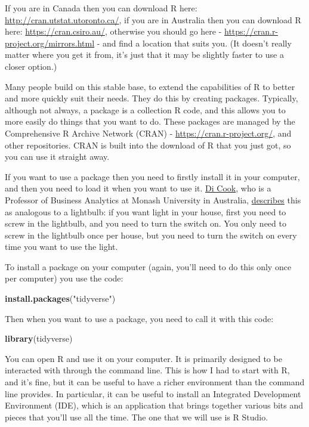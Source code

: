 \documentclass[
]{book}
\newenvironment{Shaded}{\begin{snugshade}}{\end{snugshade}}
\newcommand{\KeywordTok}[1]{\textcolor[rgb]{0.13,0.29,0.53}{\textbf{#1}}}
\newcommand{\NormalTok}[1]{#1}
\newcommand{\StringTok}[1]{\textcolor[rgb]{0.31,0.60,0.02}{#1}}
\begin{document}
If you are in Canada then you can download R here: \url{http://cran.utstat.utoronto.ca/}, if you are in Australia then you can download R here: \url{https://cran.csiro.au/}, otherwise you should go here - \url{https://cran.r-project.org/mirrors.html} - and find a location that suits you. (It doesn't really matter where you get it from, it's just that it may be slightly faster to use a closer option.)

Many people build on this stable base, to extend the capabilities of R to better and more quickly suit their needs. They do this by creating packages. Typically, although not always, a package is a collection R code, and this allows you to more easily do things that you want to do. These packages are managed by the Comprehensive R Archive Network (CRAN) - \url{https://cran.r-project.org/}, and other repositories. CRAN is built into the download of R that you just got, so you can use it straight away.

If you want to use a package then you need to firstly install it in your computer, and then you need to load it when you want to use it. \href{http://dicook.org/}{Di Cook}, who is a Professor of Business Analytics at Monash University in Australia, \href{https://twitter.com/visnut/status/1248087845589274624}{describes} this as analogous to a lightbulb: if you want light in your house, first you need to screw in the lightbulb, and you need to turn the switch on. You only need to screw in the lightbulb once per house, but you need to turn the switch on every time you want to use the light.

To install a package on your computer (again, you'll need to do this only once per computer) you use the code:

\begin{Shaded}
\begin{Highlighting}[]
\KeywordTok{install.packages}\NormalTok{(}\StringTok{"tidyverse"}\NormalTok{)}
\end{Highlighting}
\end{Shaded}

Then when you want to use a package, you need to call it with this code:

\begin{Shaded}
\begin{Highlighting}[]
\KeywordTok{library}\NormalTok{(tidyverse)}
\end{Highlighting}
\end{Shaded}

You can open R and use it on your computer. It is primarily designed to be interacted with through the command line. This is how I had to start with R, and it's fine, but it can be useful to have a richer environment than the command line provides. In particular, it can be useful to install an Integrated Development Environment (IDE), which is an application that brings together various bits and pieces that you'll use all the time. The one that we will use is R Studio.
\end{document}
